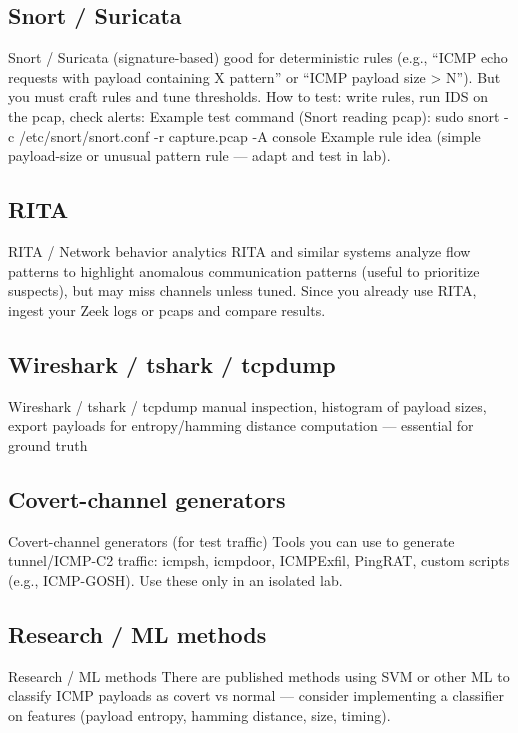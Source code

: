 \subsection{Snort / Suricata} 
Snort / Suricata (signature-based)
good for deterministic rules (e.g., “ICMP echo requests with payload containing X pattern” or 
“ICMP payload size > N”). But you must craft rules and tune thresholds. 
%
How to test: write rules, run IDS on the pcap, check alerts: 
%
Example test command (Snort reading pcap): sudo snort -c /etc/snort/snort.conf -r capture.pcap -A console
Example rule idea (simple payload-size or unusual pattern rule — adapt and test in lab). 

\subsection{RITA} 
RITA / Network behavior analytics 
RITA and similar systems analyze flow patterns to highlight anomalous communication patterns 
(useful to prioritize suspects), but may miss channels unless tuned. Since you already use RITA, 
ingest your Zeek logs or pcaps and compare results. 

\subsection{Wireshark / tshark / tcpdump} 
Wireshark / tshark / tcpdump
manual inspection, histogram of payload sizes, export payloads for entropy/hamming distance computation — essential for ground truth

\subsection{Covert-channel generators} 
Covert-channel generators (for test traffic)
Tools you can use to generate tunnel/ICMP-C2 traffic: icmpsh, icmpdoor, ICMPExfil, PingRAT, custom scripts (e.g., ICMP-GOSH). Use these only in an isolated lab.

\subsection{Research / ML methods} 
Research / ML methods
There are published methods using SVM or other ML to classify ICMP payloads as covert vs normal — consider implementing a classifier on features (payload entropy, hamming distance, size, timing).

